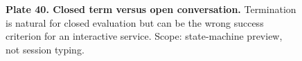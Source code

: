 \begin{figure}[p]\centering{}\caption{\textbf{Plate 40. Closed term versus open conversation.} Termination is natural for closed evaluation but can be the wrong success criterion for an interactive service. Scope: state-machine preview, not session typing.}\label{plate:closed-open}\end{figure}
